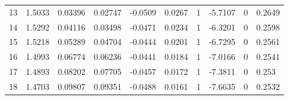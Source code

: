 \begin{singlespace}
\begin{table}[H]
\begin{tabular}{|l|l|l|l|l|l|l|l|l|l|}
13    & 1.5033  & 0.03396 & 0.02747 & -0.0509 & 0.0267  & 1       & -5.7107 & 0      & 0.2649  \\
14    & 1.5292  & 0.04116 & 0.03498 & -0.0471 & 0.0234  & 1       & -6.3201 & 0      & 0.2598  \\
15    & 1.5218  & 0.05289 & 0.04704 & -0.0444 & 0.0201  & 1       & -6.7295 & 0      & 0.2561  \\
16    & 1.4993  & 0.06774 & 0.06236 & -0.0441 & 0.0184  & 1       & -7.0166 & 0      & 0.2541  \\
17    & 1.4893  & 0.08202 & 0.07705 & -0.0457 & 0.0172  & 1       & -7.3811 & 0      & 0.253   \\
18    & 1.4703  & 0.09807 & 0.09351 & -0.0488 & 0.0161  & 1       & -7.6635 & 0      & 0.2532 
\end{tabular}
\end{table}


\end{singlespace}
